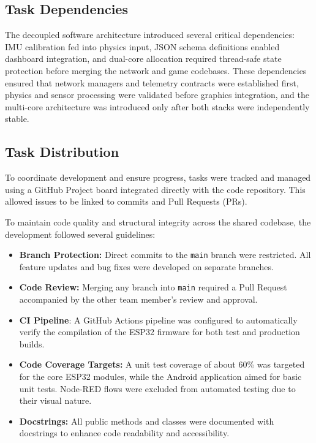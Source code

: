 \documentclass[10pt,journal,final,a4paper]{IEEEtran}
\begin{document}
\subsection{Task Dependencies}
\label{subsec:task_dependencies}

The decoupled software architecture introduced several critical dependencies:
IMU calibration fed into physics input, JSON schema definitions enabled dashboard integration, and dual-core allocation required thread-safe state protection before merging the network and game codebases. These dependencies ensured that network managers and telemetry contracts were established first, physics and sensor processing were validated before graphics integration, and the multi-core architecture was introduced only after both stacks were independently stable.

\subsection{Task Distribution}
\label{subsec:task_distribution}

To coordinate development and ensure progress, tasks were tracked and managed using a GitHub Project board integrated directly with the code repository. This allowed issues to be linked to commits and Pull Requests (PRs).

To maintain code quality and structural integrity across the shared codebase, the development followed several guidelines:

\begin{itemize}
    \item \textbf{Branch Protection:} Direct commits to the \texttt{main} branch were restricted. All feature updates and bug fixes were developed on separate branches.
    \item \textbf{Code Review:} Merging any branch into \texttt{main} required a Pull Request accompanied by the other team member's review and approval.
    \item \textbf{CI Pipeline}: A GitHub Actions pipeline was configured to automatically verify the compilation of the ESP32 firmware for both test and production builds.
    \item \textbf{Code Coverage Targets:} A unit test coverage of about 60\% was targeted for the core ESP32 modules, while the Android application aimed for basic unit tests. Node-RED flows were excluded from automated testing due to their visual nature.
    \item \textbf{Docstrings:} All public methods and classes were documented with docstrings to enhance code readability and accessibility.
\end{itemize}
\end{document}
